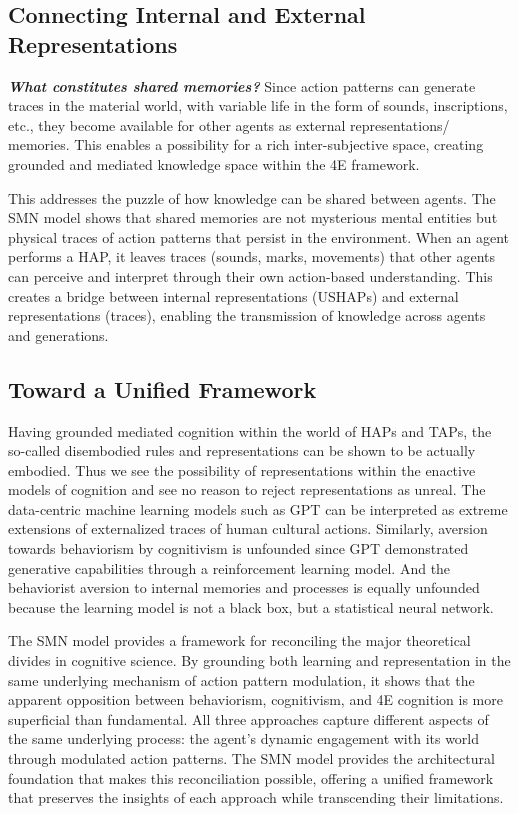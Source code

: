 \subsection{Connecting Internal and External Representations}
\textbf{\textit{What constitutes shared memories?}} Since action patterns can generate traces in the material world, with variable life in the form of sounds, inscriptions, etc., they become available for other agents as external representations/ memories. This enables a possibility for a rich inter-subjective space, creating grounded and mediated knowledge space within the 4E framework.

This addresses the puzzle of how knowledge can be shared between agents. The SMN model shows that shared memories are not mysterious mental entities but physical traces of action patterns that persist in the environment. When an agent performs a HAP, it leaves traces (sounds, marks, movements) that other agents can perceive and interpret through their own action-based understanding. This creates a bridge between internal representations (USHAPs) and external representations (traces), enabling the transmission of knowledge across agents and generations.

\subsection{Toward a Unified Framework}
Having grounded mediated cognition within the world of HAPs and TAPs, the so-called disembodied rules and representations can be shown to be actually embodied. Thus we see the possibility of representations within the enactive models of cognition and see no reason to reject representations as unreal. The data-centric machine learning models such as GPT can be interpreted as extreme extensions of externalized traces of human cultural actions. Similarly, aversion towards behaviorism by cognitivism is unfounded since GPT demonstrated generative capabilities through a reinforcement learning model. And the behaviorist aversion to internal memories and processes is equally unfounded because the learning model is not a black box, but a statistical neural network. 

The SMN model provides a framework for reconciling the major theoretical divides in cognitive science. By grounding both learning and representation in the same underlying mechanism of action pattern modulation, it shows that the apparent opposition between behaviorism, cognitivism, and 4E cognition is more superficial than fundamental. All three approaches capture different aspects of the same underlying process: the agent's dynamic engagement with its world through modulated action patterns. The SMN model provides the architectural foundation that makes this reconciliation possible, offering a unified framework that preserves the insights of each approach while transcending their limitations.


